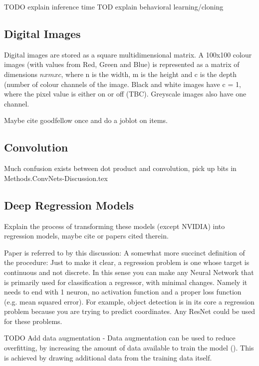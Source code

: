TODO explain inference time
TOD explain behavioral learning/cloning

\subsection{Digital Images}
Digital images are stored as a square multidimensional matrix. A 100x100 colour images (with values from Red, Green and Blue) is represented as a matrix of dimensions $n x m x c$, where n is the width, m is the height and c is the depth (number of colour channels of the image. Black and white images have c = 1, where the pixel value is either on or off (TBC). Greyscale images also have one channel.

Maybe cite goodfellow once and do a joblot on items.  

\subsection{Convolution}
Much confusion exists between dot product and convolution, pick up bits in Methods.ConvNets-Discussion.tex

\subsection{Deep Regression Models}
Explain the process of transforming these models (except NVIDIA) into regression models, maybe cite \cite{lathuilire2018comprehensive} or papers cited therein.

Paper is referred to by this discussion: 
A somewhat more succinct definition of the procedure:  
Just to make it clear, a regression problem is one whose target is continuous and not discrete. In this sense you can make any Neural Network that is primarily used for classification a regressor, with minimal changes. Namely it needs to end with 1 neuron, no activation function and a proper loss function (e.g. mean squared error). For example, object detection is in its core a regression problem because you are trying to predict coordinates. Any ResNet could be used for these problems. 
  
TODO Add data augmentation - Data augmentation can be used to reduce overfitting, by increasing the amount of data available to train the model (\cite{perez2017effectiveness}). This is achieved by drawing additional data from the training data itself.  
  
